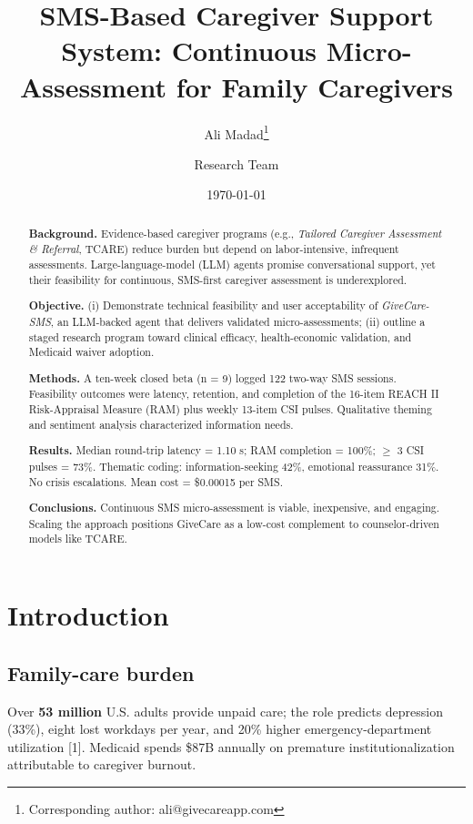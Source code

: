 \documentclass[12pt]{article}
\title{SMS-Based Caregiver Support System: Continuous Micro-Assessment for Family Caregivers}
\author[1]{Ali Madad\thanks{Corresponding author: ali@givecareapp.com}}
\author[2]{Research Team}
\affil[1]{SCTY / GiveCare, New York, USA}
\affil[2]{Academic Institution}
\date{\today}
\begin{document}
\maketitle

\begin{abstract}
\textbf{Background.} Evidence-based caregiver programs (e.g., \emph{Tailored Caregiver Assessment \& Referral}, TCARE) reduce burden but depend on labor-intensive, infrequent assessments. Large-language-model (LLM) agents promise conversational support, yet their feasibility for continuous, SMS-first caregiver assessment is underexplored.

\textbf{Objective.} (i) Demonstrate technical feasibility and user acceptability of \emph{GiveCare-SMS}, an LLM-backed agent that delivers validated micro-assessments; (ii) outline a staged research program toward clinical efficacy, health-economic validation, and Medicaid waiver adoption.

\textbf{Methods.} A ten-week closed beta (n = 9) logged 122 two-way SMS sessions. Feasibility outcomes were latency, retention, and completion of the 16-item REACH II Risk-Appraisal Measure (RAM) plus weekly 13-item CSI pulses. Qualitative theming and sentiment analysis characterized information needs.

\textbf{Results.} Median round-trip latency = 1.10 s; RAM completion = 100\%; $\geq$ 3 CSI pulses = 73\%. Thematic coding: information-seeking 42\%, emotional reassurance 31\%. No crisis escalations. Mean cost = \$0.00015 per SMS.

\textbf{Conclusions.} Continuous SMS micro-assessment is viable, inexpensive, and engaging. Scaling the approach positions GiveCare as a low-cost complement to counselor-driven models like TCARE.
\end{abstract}

\section{Introduction}

\subsection{Family-care burden}
Over \textbf{53 million} U.S. adults provide unpaid care; the role predicts depression (33\%), eight lost workdays per year, and 20\% higher emergency-department utilization [1]. Medicaid spends \$87B annually on premature institutionalization attributable to caregiver burnout.
\end{document}
